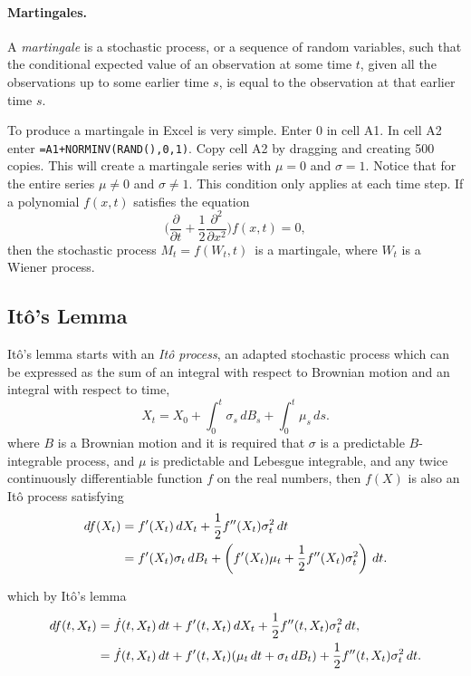 \paragraph{Martingales.} A \emph{martingale} is a stochastic process, or a sequence of random variables, such that the conditional expected value of an observation at some time $t$, given all the observations up to some earlier time $s$, is equal to the observation at that earlier time $s$.

To produce a martingale in Excel is very simple. Enter 0 in cell A1. In cell A2 enter \texttt{=A1+NORMINV(RAND(),0,1)}. Copy cell A2 by dragging and creating 500 copies. This will create a martingale series with $\mu=0$ and $\sigma=1$. Notice that for the entire series $\mu \ne 0$ and $\sigma \ne 1$. This condition only applies at each time step. If a polynomial $f(x,t)$ satisfies the equation
\[
\Big( \frac{\partial}{\partial t} + \frac12 \frac{\partial^2}{\partial x^2} \Big) f(x,t) = 0,
\]
then the stochastic process $M_t = f ( W_t, t ) \,$ is a martingale, where $W_t$ is a Wiener process.

\subsection{It\^{o}'s Lemma}
It\^{o}'s lemma starts with an \emph{It\^{o} process}, an adapted stochastic process which can be expressed as the sum of an integral with respect to Brownian motion and an integral with respect to time,
\begin{equation}
X_t=X_0+\int_0^t\sigma_s\,dB_s+\int_0^t\mu_s\,ds.
\label{eq:ito-process}
\end{equation}
where $B$ is a Brownian motion and it is required that $\sigma$ is a predictable $B$-integrable process, and $\mu$ is predictable and Lebesgue integrable, and any twice continuously differentiable function $f$ on the real numbers, then $f(X)$ is also an It\^{o} process satisfying
\begin{align}
df(X_t) &= f^\prime(X_t)\,dX_t + \frac{1}{2}f^{\prime\prime}(X_t)\sigma^2_t\,dt \notag \\
&= f^\prime(X_t)\sigma_t\,dB_t + \left(f^\prime(X_t)\mu_t+\frac{1}{2}f^{\prime\prime}(X_t)\sigma^2_t\right)\,dt. \notag
\end{align}

which by It\^{o}'s lemma
\begin{align}
df(t,X_t)&=\dot{f}(t,X_t)\,dt+f'(t,X_t)\,dX_t+\frac{1}{2}f''(t,X_t)\sigma^2_t\,dt, \notag \\ &=\dot{f}(t,X_t)\,dt+f'(t,X_t)(\mu_t\,dt + \sigma_t\,dB_t)+\frac{1}{2}f''(t,X_t)\sigma^2_t\,dt.
\end{align}

